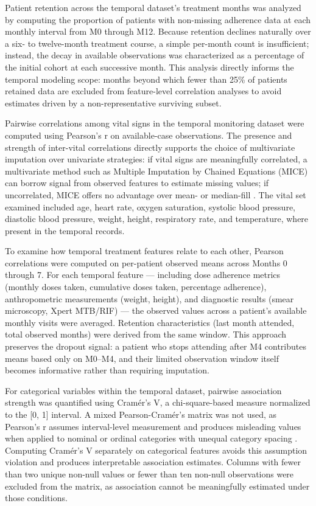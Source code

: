 \documentclass[12pt]{article}
\begin{document}
Patient retention across the temporal dataset's treatment months was analyzed by computing the proportion of patients with non-missing adherence data at each monthly interval from M0 through M12. Because retention declines naturally over a six- to twelve-month treatment course, a simple per-month count is insufficient; instead, the decay in available observations was characterized as a percentage of the initial cohort at each successive month. This analysis directly informs the temporal modeling scope: months beyond which fewer than 25\% of patients retained data are excluded from feature-level correlation analyses to avoid estimates driven by a non-representative surviving subset.

Pairwise correlations among vital signs in the temporal monitoring dataset were computed using Pearson's r on available-case observations. The presence and strength of inter-vital correlations directly supports the choice of multivariate imputation over univariate strategies: if vital signs are meaningfully correlated, a multivariate method such as Multiple Imputation by Chained Equations (MICE) can borrow signal from observed features to estimate missing values; if uncorrelated, MICE offers no advantage over mean- or median-fill \citep{ref35}. The vital set examined included age, heart rate, oxygen saturation, systolic blood pressure, diastolic blood pressure, weight, height, respiratory rate, and temperature, where present in the temporal records.

To examine how temporal treatment features relate to each other, Pearson correlations were computed on per-patient observed means across Months 0 through 7. For each temporal feature — including dose adherence metrics (monthly doses taken, cumulative doses taken, percentage adherence), anthropometric measurements (weight, height), and diagnostic results (smear microscopy, Xpert MTB/RIF) — the observed values across a patient's available monthly visits were averaged. Retention characteristics (last month attended, total observed months) were derived from the same window. This approach preserves the dropout signal: a patient who stops attending after M4 contributes means based only on M0--M4, and their limited observation window itself becomes informative rather than requiring imputation.

For categorical variables within the temporal dataset, pairwise association strength was quantified using Cram\'{e}r's V, a chi-square-based measure normalized to the [0, 1] interval. A mixed Pearson-Cram\'{e}r's matrix was not used, as Pearson's r assumes interval-level measurement and produces misleading values when applied to nominal or ordinal categories with unequal category spacing \citep{ref27}. Computing Cram\'{e}r's V separately on categorical features avoids this assumption violation and produces interpretable association estimates. Columns with fewer than two unique non-null values or fewer than ten non-null observations were excluded from the matrix, as association cannot be meaningfully estimated under those conditions.
\end{document}
